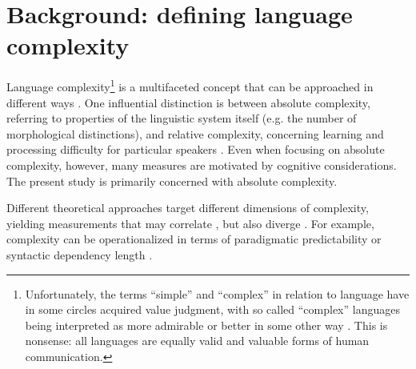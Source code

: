 \documentclass[USenglish]{article}
\begin{document}
\section{Background: defining language complexity}\label{sec:background}
Language complexity\footnote{Unfortunately, the terms ``simple'' and ``complex'' in relation to language have in some circles acquired value judgment, with so called ``complex'' languages being interpreted as more admirable or better in some other way \citep[4-5]{sampson_linguistic_2009}. 
This is nonsense: all languages are equally valid and valuable forms of human communication.} is a multifaceted concept that can be approached in different ways \citep{raviv_what_2022}.
One influential distinction is between absolute complexity, referring to properties of the linguistic system itself (e.g. the number of morphological distinctions), and relative complexity, concerning learning and processing difficulty for particular speakers \citep{miestamo_complexity_2006, miestamo_grammatical_2008}. 
Even when focusing on absolute complexity, however, many measures are motivated by cognitive considerations.
The present study is primarily concerned with absolute complexity.

Different theoretical approaches target different dimensions of complexity, yielding measurements that may correlate \citep{bentz2016comparison, bentz_complexity_2023, ccoltekin2023complexity}, but also diverge \citep{lupyan2024cautionary}.
For example, complexity can be operationalized in terms of paradigmatic predictability \citep{round_cognition_2022, ackerman_parts_2009, cotterell2019complexity} or syntactic dependency length \citep{gibson1998linguistic, liu2008dependency}.
\end{document}
